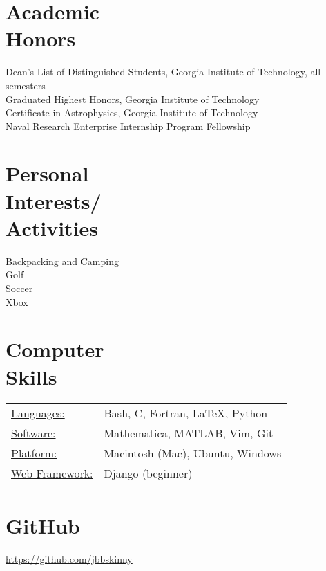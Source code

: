 \documentclass[margin]{res}
\begin{document}
\begin{resume}
\section{Academic \\ Honors} 
Dean's List of Distinguished Students, Georgia Institute of Technology, all semesters \\
Graduated Highest Honors, Georgia Institute of Technology \\
Certificate in Astrophysics, Georgia Institute of Technology \\
Naval Research Enterprise Internship Program Fellowship

\section{Personal \\ Interests/ \\Activities}
Backpacking and Camping \\
Golf \\
Soccer \\
Xbox

\section{Computer \\ Skills}
   \begin{tabular}{l p{3in}}
    \underline{Languages:} & Bash, C, Fortran, \LaTeX, Python \\
    \underline{Software:} & Mathematica, MATLAB, Vim, Git \\
    \underline{Platform:} & Macintosh (Mac), Ubuntu, Windows \\
    \underline{Web Framework:} & Django (beginner) 
   \end{tabular}

\section{GitHub}
\url{https://github.com/jbbskinny} \\ \\

\end{resume} 
\end{document}

